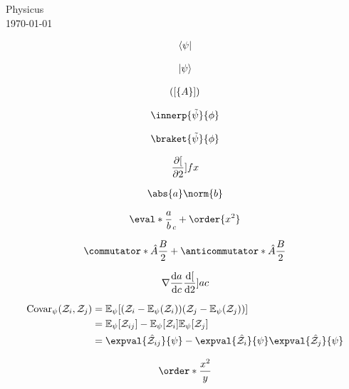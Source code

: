 \documentclass[11pt]{article}
\begin{document}
\begin{center}
  {\Large Physicus} \\ \vspace{5mm}
  \today
\end{center}


\begin{align*}
  \langle\psi\rvert
\end{align*}

\begin{align*}
  \lvert\psi\rangle
\end{align*}

\begin{align*}
  \lparen\lbrack\lbrace A\rbrace\rbrack\rparen
\end{align*}

\begin{align*}
  \innerp{\tilde{\psi}}{\phi}
\end{align*}

\begin{align*}
  \braket{\tilde{\psi}}{\phi}
\end{align*}

\begin{align*}
  \pdv[2]{f}{x}
\end{align*}

\begin{align*}
  \abs{a}\norm{b}
\end{align*}

\begin{align*}
  \eval*{\frac{a}{b}}_c + \order{x^2}
\end{align*}

\begin{align*}
  \commutator*{\hat{A}}{\frac{B}{2}} + \anticommutator*{\hat{A}}{\frac{B}{2}}
\end{align*}

\begin{align*}
  \grad\dv{a}{c}\dv[2]{a}{c}
\end{align*}

\begin{align*}
  \text{Covar}_\psi\pqty{\mathcal{Z}_i,\mathcal{Z}_j}
  & = \mathbb{E}_\psi\bqty{ \pqty{\mathcal{Z}_i - \mathbb{E}_\psi\pqty{ \mathcal{Z}_i}} \pqty{\mathcal{Z}_j - \mathbb{E}_\psi\pqty{ \mathcal{Z}_j}} } \\
  & = \mathbb{E}_\psi\bqty*{\mathcal{Z}_{ij}} - \mathbb{E}_\psi\bqty*{\mathcal{Z}_i}\mathbb{E}_\psi\bqty*{\mathcal{Z}_j}                              \\
  & = \expval{\hat{\mathcal{Z}}_{ij}}{\psi} - \expval{\hat{\mathcal{Z}}_{i}}{\psi}\expval{\hat{\mathcal{Z}}_{j}}{\psi}
\end{align*}

\begin{align*}
  \order*{\frac{x^2}{y}}
\end{align*}
\end{document}
